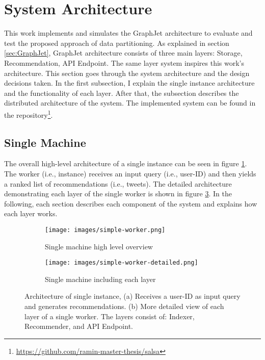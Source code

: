 \section{System Architecture}
\label{sec:system-architecture}

This work implements and simulates the GraphJet architecture to evaluate and test the proposed approach of data partitioning. As explained in section \ref{sec:GraphJet}, GraphJet architecture consists of three main layers: Storage, Recommendation, API Endpoint. The same layer system inspires this work's architecture. This section goes through the system architecture and the design decisions taken. In the first subsection, I explain the single instance architecture and the functionality of each layer. After that, the subsection describes the distributed architecture of the system. The implemented system can be found in the repository\footnote{\url{https://github.com/ramin-master-thesis/salsa}}.


\subsection{Single Machine}
\label{subsec:single-machine}
The overall high-level architecture of a single instance can be seen in figure \ref{fig:single-machine-architecture}. The worker (i.e., instance) receives an input query (i.e., user-ID) and then yields a ranked list of recommendations (i.e., tweets). The detailed architecture demonstrating each layer of the single worker is shown in figure \ref{fig:single-machine-architecture-detailed}. In the following, each section describes each component of the system and explains how each layer works.

\begin{figure}[!h]
    \centering
    \begin{subfigure}[b]{0.75\textwidth}
       \texttt{[image: images/simple-worker.png]}
       \caption{Single machine high level overview}
       \label{fig:single-machine-architecture} 
    \end{subfigure}
    
    \begin{subfigure}[b]{0.8\textwidth}
       \texttt{[image: images/simple-worker-detailed.png]}
       \caption{Single machine including each layer}
       \label{fig:single-machine-architecture-detailed}
    \end{subfigure}
    
    \caption {Architecture of single instance, (a) Receives a user-ID as input query and generates recommendations. (b) More detailed view of each layer of a single worker. The layers consist of: Indexer, Recommender, and API Endpoint.}
\end{figure}


